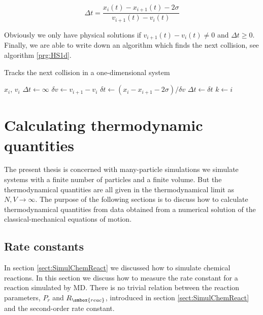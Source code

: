\begin{equation}
  \Delta t = \frac{x_i(t)-x_{i+1}(t)-2\sigma}{v_{i+1}(t)-v_i(t)}
\end{equation}

Obviously we only have physical solutions if $v_{i+1}(t)-v_i(t)
\not= 0$ and $\Delta t \ge 0$. Finally, we are able to write down an
algorithm which finds the next collision, see algorithm
\ref{prg:HS1d}.  

\begin{algorithm}
  \caption[The next collision]{Tracks the next collision in a one-dimensional system}
  \label{prg:HS1d}
  \begin{algorithmic}
    \REQUIRE $x_i$, $v_i$
    \STATE $\Delta t \leftarrow \infty$
      \STATE $\delta v \leftarrow v_{i+1}-v_i$
        \STATE $\delta t \leftarrow (x_i-x_{i+1}-2\sigma)/\delta v$
          \STATE $\Delta t \leftarrow \delta t$
          \STATE $k \leftarrow i$
        \ENDIF
      \ENDIF
    \ENDFOR
  \end{algorithmic}
\end{algorithm}



\section{Calculating thermodynamic quantities}
\label{sect:CalcThermo}
The present thesis is concerned with many-particle simulations \ie we
simulate systems with a finite number of particles and a finite
volume. But the thermodynamical quantities are all given in the
thermodynamical limit \ie as $N, V \rightarrow \infty$. The purpose of
the following sections is to discuss how to calculate thermodynamical
quantities from data obtained from a numerical solution of the
classical-mechanical equations of motion.


\subsection{Rate constants}
\label{sect:MeasureRate}
In section \ref{sect:SimulChemReact} we discussed how to simulate
chemical reactions. In this section we discuss how to measure the rate
constant for a reaction simulated by MD. There is no trivial relation
between the reaction parameters, $P_r$ and $R_{\smbox{reac}}$,
introduced in section \ref{sect:SimulChemReact} and the second-order
rate constant. 

